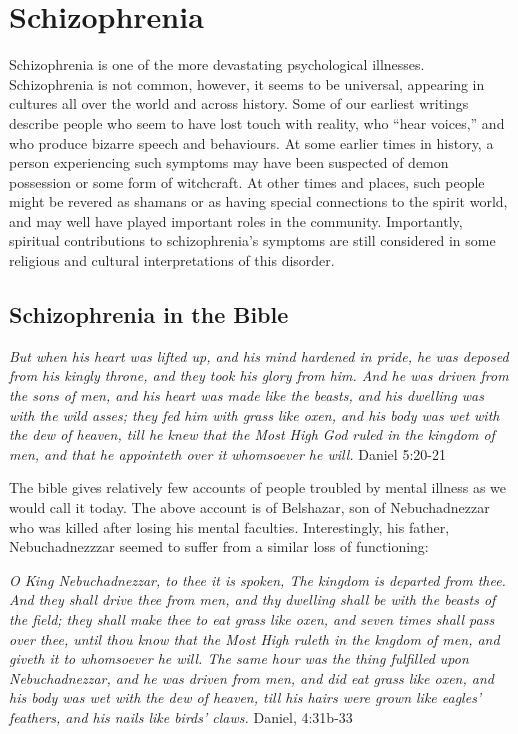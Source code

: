 \documentclass[
]{book}
\begin{document}
\hypertarget{schizophrenia}{%
\section{Schizophrenia}\label{schizophrenia}}

Schizophrenia is one of the more devastating psychological illnesses. Schizophrenia is not common, however, it seems to be universal, appearing in cultures all over the world and across history. Some of our earliest writings describe people who seem to have lost touch with reality, who ``hear voices,'' and who produce bizarre speech and behaviours. At some earlier times in history, a person experiencing such symptoms may have been suspected of demon possession or some form of witchcraft. At other times and places, such people might be revered as shamans or as having special connections to the spirit world, and may well have played important roles in the community. Importantly, spiritual contributions to schizophrenia's symptoms are still considered in some religious and cultural interpretations of this disorder.

\hypertarget{schizophrenia-in-the-bible}{%
\subsection*{Schizophrenia in the Bible}\label{schizophrenia-in-the-bible}}

\emph{But when his heart was lifted up, and his mind hardened in pride, he was deposed from his kingly throne, and they took his glory from him. And he was driven from the sons of men, and his heart was made like the beasts, and his dwelling was with the wild asses; they fed him with grass like oxen, and his body was wet with the dew of heaven, till he knew that the Most High God ruled in the kingdom of men, and that he appointeth over it whomsoever he will.} Daniel 5:20-21

The bible gives relatively few accounts of people troubled by mental illness as we would call it today. The above account is of Belshazar, son of Nebuchadnezzar who was killed after losing his mental faculties. Interestingly, his father, Nebuchadnezzzar seemed to suffer from a similar loss of functioning:

\emph{O King Nebuchadnezzar, to thee it is spoken, The kingdom is departed from thee. And they shall drive thee from men, and thy dwelling shall be with the beasts of the field; they shall make thee to eat grass like oxen, and seven times shall pass over thee, until thou know that the Most High ruleth in the kngdom of men, and giveth it to whomsoever he will. The same hour was the thing fulfilled upon Nebuchadnezzar, and he was driven from men, and did eat grass like oxen, and his body was wet with the dew of heaven, till his hairs were grown like eagles' feathers, and his nails like birds' claws.} Daniel, 4:31b-33
\end{document}
